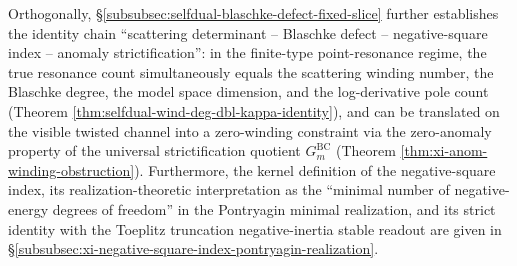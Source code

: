 Orthogonally, \S\ref{subsubsec:selfdual-blaschke-defect-fixed-slice} further establishes the identity chain ``scattering determinant -- Blaschke defect -- negative-square index -- anomaly strictification'': in the finite-type point-resonance regime, the true resonance count simultaneously equals the scattering winding number, the Blaschke degree, the model space dimension, and the log-derivative pole count (Theorem \ref{thm:selfdual-wind-deg-dbl-kappa-identity}), and can be translated on the visible twisted channel into a zero-winding constraint via the zero-anomaly property of the universal strictification quotient \(G^{\mathrm{BC}}_m\) (Theorem \ref{thm:xi-anom-winding-obstruction}).
Furthermore, the kernel definition of the negative-square index, its realization-theoretic interpretation as the ``minimal number of negative-energy degrees of freedom'' in the Pontryagin minimal realization, and its strict identity with the Toeplitz truncation negative-inertia stable readout are given in \S\ref{subsubsec:xi-negative-square-index-pontryagin-realization}.

\endinput
